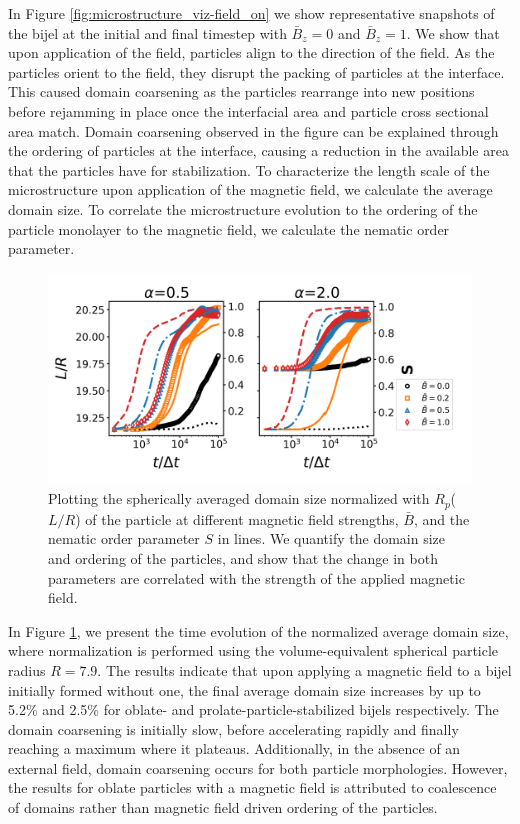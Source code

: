 In Figure \ref{fig:microstructure_viz-field_on} we show representative snapshots of the bijel at the initial and final timestep with $\bar{B}_z = 0$ and $\bar{B}_z = 1$. 
We show that upon application of the field, particles align to the direction of the field. As the particles orient to the field, they disrupt the packing of particles at
the interface. This caused domain coarsening as the particles rearrange into new positions before rejamming in place once the interfacial
area and particle cross sectional area match. Domain coarsening observed in the figure can be explained through the ordering of particles at the interface, causing a 
reduction in the available area that the particles have for stabilization. To characterize the length scale of the microstructure upon application of the magnetic field,
we calculate the average domain size. To correlate the microstructure evolution to the ordering of the particle monolayer to the magnetic field, we calculate the 
nematic order parameter. \cite{veerman_phase_1992} 

\begin{figure} 
\centering 
\includegraphics[scale=0.5]{../figures/results/paper2/domain_size-field_on.png} 
\caption{Plotting the spherically averaged domain size normalized with $R_p$($L/R$) of the particle at different magnetic field strengths, $\bar{B}$, and the nematic order parameter $S$ in lines. We quantify the domain size and ordering of the particles, and show that the change in both parameters are correlated with the strength of the applied magnetic field.} 
\label{fig:domain_size-field_on} 
\end{figure}

In Figure \ref{fig:domain_size-field_on}, we present the time evolution of the normalized average domain size, where normalization is performed
using the volume-equivalent spherical particle radius $R = 7.9$. The results indicate that upon applying a magnetic field to a bijel
initially formed without one, the final average domain size increases by up to 5.2\% and 2.5\% for oblate- and prolate-particle-stabilized bijels
respectively. The domain coarsening is initially slow, before accelerating rapidly and finally reaching a maximum where it plateaus. 
Additionally, in the absence of an external field, domain coarsening occurs for both particle morphologies. However, the results
for oblate particles with a magnetic field is attributed to coalescence of domains rather than magnetic field driven ordering of the particles.

